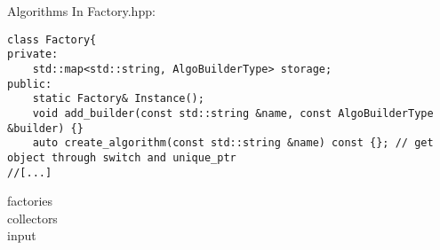 


\begin{frame}{Algorithms}
In Factory.hpp:
\begin{verbatim}
class Factory{
private:
    std::map<std::string, AlgoBuilderType> storage;
public:
    static Factory& Instance();
    void add_builder(const std::string &name, const AlgoBuilderType &builder) {}
    auto create_algorithm(const std::string &name) const {}; // get object through switch and unique_ptr
//[...]
\end{verbatim}

\end{frame}

factories \\
collectors \\
input
